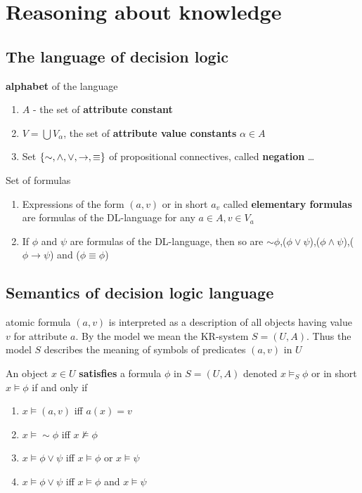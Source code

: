 \documentclass[11pt]{article}
\begin{document}
\section{Reasoning about knowledge}
\label{sec:orgb88ada7}
\subsection{The language of decision logic}
\label{sec:org3bb433c}
\textbf{alphabet} of the language
\begin{enumerate}
\item \(A\) - the set of \textbf{attribute constant}
\item \(V=\bigcup V_\alpha\), the set of \textbf{attribute value constants} \(\alpha\in A\)
\item Set \(\left\{\sim,\wedge,\vee,\to,\equiv\right\}\) of propositional connectives, called \textbf{negation} \ldots{}
\end{enumerate}


Set of formulas
\begin{enumerate}
\item Expressions of the form \((a,v)\) or in short \(a_v\) called \textbf{elementary
formulas} are formulas of the DL-language for any \(a\in A,v\in V_a\)
\item If \(\phi\) and \(\psi\) are formulas of the DL-language, then so are
\(\sim\phi\),(\(\phi \vee \psi\)),(\(\phi \wedge \psi\)),(\(\phi \to \psi\)) and (\(\phi \equiv \phi\))
\end{enumerate}
\subsection{Semantics of decision logic language}
\label{sec:org511499c}
atomic formula \((a,v)\) is interpreted as a description of all objects having
value \(v\) for attribute \(a\). By the model we mean the KR-system \(S=(U,A)\).
Thus the model \(S\) describes the meaning of symbols of predicates \((a,v)\) in \(U\)


An object \(x\in U\) \textbf{satisfies} a formula \(\phi\) in \(S=(U,A)\) denoted \(x\models_S\phi\)
or in short \(x\models\phi\) if and only if
\begin{enumerate}
\item \(x\models(a,v)\) iff \(a(x)=v\)
\item \(x\models\sim\phi\) iff \(x\not\models\phi\)
\item \(x\models\phi\vee\psi\) iff \(x\models\phi\) or \(x\models\psi\)
\item \(x\models\phi\vee\psi\) iff \(x\models\phi\) and \(x\models\psi\)
\end{enumerate}
\end{document}
